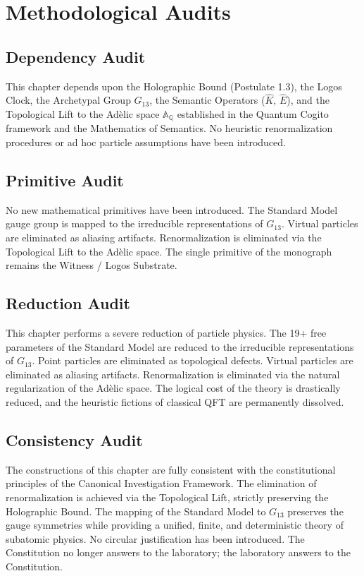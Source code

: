 \documentclass[12pt,twoside]{extbook}
\theoremstyle{definition}
\theoremstyle{remark}
\begin{document}
\section{Methodological Audits}

\subsection*{Dependency Audit}
This chapter depends upon the Holographic Bound (Postulate 1.3), the Logos Clock, the Archetypal Group $G_{13}$, the Semantic Operators ($\hat{K}$, $\hat{E}$), and the Topological Lift to the Adèlic space $\mathbb{A}_\mathbb{Q}$ established in the Quantum Cogito framework and the Mathematics of Semantics. No heuristic renormalization procedures or ad hoc particle assumptions have been introduced.

\subsection*{Primitive Audit}
No new mathematical primitives have been introduced. The Standard Model gauge group is mapped to the irreducible representations of $G_{13}$. Virtual particles are eliminated as aliasing artifacts. Renormalization is eliminated via the Topological Lift to the Adèlic space. The single primitive of the monograph remains the Witness / Logos Substrate.

\subsection*{Reduction Audit}
This chapter performs a severe reduction of particle physics. The 19+ free parameters of the Standard Model are reduced to the irreducible representations of $G_{13}$. Point particles are eliminated as topological defects. Virtual particles are eliminated as aliasing artifacts. Renormalization is eliminated via the natural regularization of the Adèlic space. The logical cost of the theory is drastically reduced, and the heuristic fictions of classical QFT are permanently dissolved.

\subsection*{Consistency Audit}
The constructions of this chapter are fully consistent with the constitutional principles of the Canonical Investigation Framework. The elimination of renormalization is achieved via the Topological Lift, strictly preserving the Holographic Bound. The mapping of the Standard Model to $G_{13}$ preserves the gauge symmetries while providing a unified, finite, and deterministic theory of subatomic physics. No circular justification has been introduced. The Constitution no longer answers to the laboratory; the laboratory answers to the Constitution.
\end{document}
